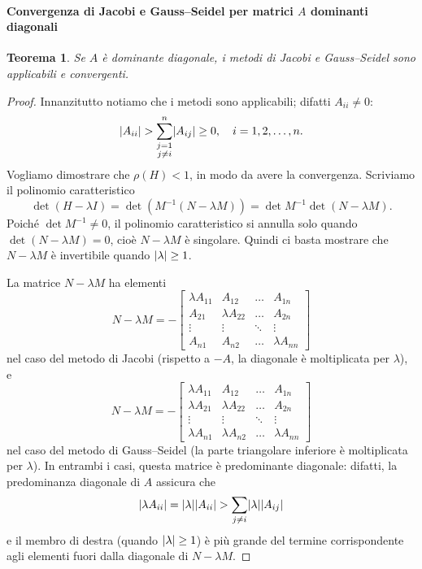 \documentclass[a4paper]{report}
\DeclarePairedDelimiter{\abs}{\lvert}{\rvert}
\newtheorem{theorem}{Teorema}[chapter]
\theoremstyle{definition}
\theoremstyle{remark}
\begin{document}
\paragraph{Convergenza di Jacobi e Gauss--Seidel per matrici $A$ dominanti diagonali}
\begin{theorem}
Se $A$ è dominante diagonale, i metodi di Jacobi e Gauss--Seidel sono applicabili e convergenti.
\end{theorem}
\begin{proof}
Innanzitutto notiamo che i metodi sono applicabili; difatti $A_{ii} \neq 0$:
\[
\abs{A_{ii}} > \sum_{\substack{j=1\\j\neq i}}^n \abs{A_{ij}} \geq 0, \quad i=1,2,\dots,n.
\]
Vogliamo dimostrare che $\rho(H)<1$, in modo da avere la convergenza. Scriviamo il polinomio caratteristico
\[
\det (H - \lambda I) = \det (M^{-1}(N-\lambda M)) = \det M^{-1} \det (N-\lambda M).
\]
Poiché $\det M^{-1} \neq 0$, il polinomio caratteristico si annulla solo quando $\det (N-\lambda M) = 0$, cioè $N-\lambda M$ è singolare. Quindi ci basta mostrare che $N-\lambda M$ è invertibile quando $\abs{\lambda} \geq 1$.

La matrice $N-\lambda M$ ha elementi
\[
N-\lambda M = -
\begin{bmatrix}
    \lambda A_{11} & A_{12} & \dots & A_{1n}\\
    A_{21} & \lambda A_{22} & \dots & A_{2n}\\
    \vdots & \vdots & \ddots & \vdots\\
    A_{n1} & A_{n2} & \dots & \lambda A_{nn}
\end{bmatrix}
\]
nel caso del metodo di Jacobi (rispetto a $-A$, la diagonale è moltiplicata per $\lambda$), e 
\[
N-\lambda M = -
\begin{bmatrix}
    \lambda A_{11} & A_{12} & \dots & A_{1n}\\
    \lambda A_{21} & \lambda A_{22} & \dots & A_{2n}\\
    \vdots & \vdots & \ddots & \vdots\\
    \lambda A_{n1} & \lambda A_{n2} & \dots & \lambda A_{nn}
\end{bmatrix}
\]
nel caso del metodo di Gauss--Seidel (la parte triangolare inferiore è moltiplicata per $\lambda$). In entrambi i casi, questa matrice è predominante diagonale: difatti, la predominanza diagonale di $A$ assicura che
\[
\abs{\lambda A_{ii}} = \abs{\lambda}\abs{ A_{ii}} > \sum_{j\neq i} \abs{\lambda} \abs{A_{ij}}
\]
e il membro di destra (quando $\abs{\lambda} \geq 1$) è più grande del termine corrispondente agli elementi fuori dalla diagonale di $N-\lambda M$.
\end{proof}
\end{document}
